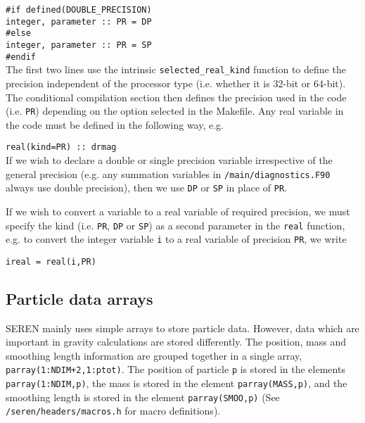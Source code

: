 \documentclass[a4paper]{article}
\newcommand{\NAME}{SEREN }
\newcommand{\name}{seren}
\newcommand{\var}[1]{\texttt{#1}}
\begin{document}
\noindent \var{\#if defined(DOUBLE\_PRECISION)} \\
\indent \var{integer, parameter :: PR = DP} \\
\noindent \var{\#else}\\
\indent \var{integer, parameter :: PR = SP} \\
\noindent \var{\#endif}\\


\noindent The first two lines use the intrinsic \var{selected\_real\_kind} function to define the precision independent of the processor type (i.e. whether it is 32-bit or 64-bit).  The conditional compilation section then defines the precision used in the code (i.e. \var{PR}) depending on the option selected in the Makefile.  Any real variable in the code must be defined in the following way, e.g. \newline

\indent \var{real(kind=PR) :: drmag} \\

\noindent If we wish to declare a double or single precision variable irrespective of the general precision (e.g. any summation variables in \var{/main/diagnostics.F90} always use double precision), then we use \var{DP} or \var{SP} in place of \var{PR}. 

If we wish to convert a variable to a real variable of required precision, we must specify the kind (i.e. \var{PR}, \var{DP} or \var{SP}) as a second parameter in the \var{real} function, e.g. to convert the integer variable \var{i} to a real variable of precision \var{PR}, we write \newline

\indent \var{ireal = real(i,PR)} \\


\subsection{Particle data arrays} \label{SS:DATA}
\NAME mainly uses simple arrays to store particle data.  However, data which are important in gravity calculations are stored differently.  The position, mass and smoothing length information are grouped together in a single array, \var{parray(1:NDIM+2,1:ptot)}.  The position of particle \var{p} is stored in the elements \var{parray(1:NDIM,p)}, the mass is stored in the element \var{parray(MASS,p)}, and the smoothing length is stored in the element \var{parray(SMOO,p)} (See \var{/\name/headers/macros.h} for macro definitions). \newline
\end{document}

